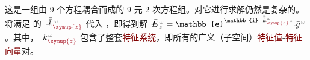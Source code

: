 这是一组由 9 个方程耦合而成的 9 元 2 次方程组。对它进行求解仍然是复杂的。将满足  的 $\Xint{\begin{smallmatrix} ~ \\ {}^{}_{\mathcolor{gray}{-}} \\ ~ \end{smallmatrix}}{15}{\bar{\bar{k}}}_{\textcolor{Maroon}{\symup{z}}}^{\;\! \mathcolor{gray}{\omega}}$ 代入 ，即得到解 $\Xint{\mathcolor{gray}{-}}{25}{\bar{E}}^{\;\!\mathcolor{gray}{\omega}}_{\;\! \mathcolor{gray}{z}} = \mathbb{e}^{\mathbb{i} \Xint{\begin{smallmatrix} ~ \\ {}^{}_{\mathcolor{gray}{-}} \\ ~ \end{smallmatrix}}{15}{\bar{\bar{k}}}_{\textcolor{Maroon}{\symup{z}}}^{\;\! \mathcolor{gray}{\omega}} \mathcolor{gray}{z}} \Xint{{}^{}_{\mathcolor{gray}{-}}}{10}{\bar{g}}^{\;\!\mathcolor{gray}{\omega}}$。其中，$\Xint{\begin{smallmatrix} ~ \\ {}^{}_{\mathcolor{gray}{-}} \\ ~ \end{smallmatrix}}{15}{\bar{\bar{k}}}_{\textcolor{Maroon}{\symup{z}}}^{\;\! \mathcolor{gray}{\omega}}$ 包含了整套\textcolor{Maroon}{特征系统}，即所有的广义（子空间）\textcolor{Maroon}{特征值}-\textcolor{Maroon}{特征向量}对\cite{xieAnalytic3DVector}。

